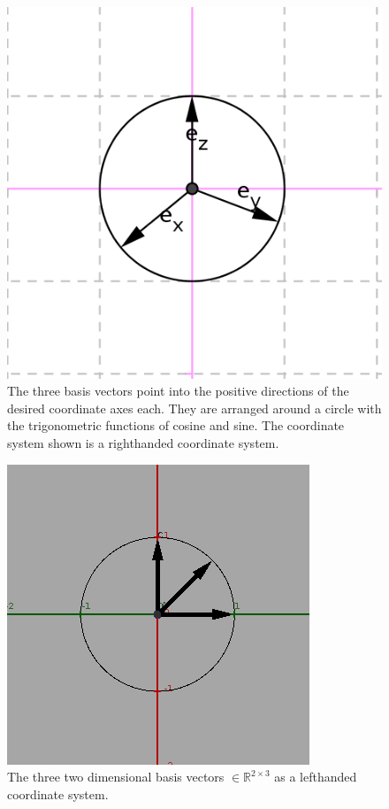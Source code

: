 \documentclass[a4paper]{article}
\begin{document}
\begin{figure}[ht]
\includegraphics[scale=1]{unitvectors.png}
\caption{The three basis vectors point into the positive directions of the desired coordinate axes each. They are arranged around a circle with the trigonometric functions of cosine and sine. The coordinate system shown is a righthanded coordinate system.}
\end{figure}

\begin{figure}[ht]
\includegraphics[scale=0.5]{lefthandbasis.png}
\caption{The three two dimensional basis vectors $\in \mathbb{R}^{2\times{3}}$ as a lefthanded coordinate system.}
\end{figure}
\end{document}
